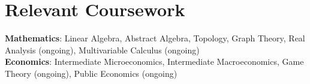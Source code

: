 \documentclass[letterpaper,11pt]{article}
\begin{document}
 \section{Relevant Coursework}
\begin{itemize}[leftmargin=0.15in, label={}]
    \normalsize{\item{
        \textbf{Mathematics}{: Linear Algebra, Abstract Algebra, Topology, Graph Theory, Real Analysis (ongoing), Multivariable Calculus (ongoing)}\\
        \textbf{Economics}{: Intermediate Microeconomics, Intermediate Macroeconomics, Game Theory (ongoing), Public Economics (ongoing)}\\
    }}    
 \end{itemize}
\end{document}

